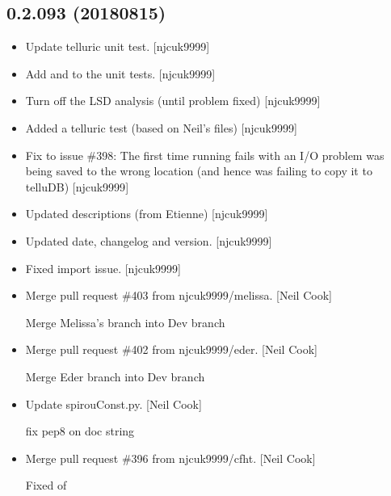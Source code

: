 \documentclass[a4paper,10pt,english]{report}
\begin{document}
\subsection{0.2.093 (2018\sphinxhyphen{}08\sphinxhyphen{}15)}
\label{\detokenize{misc/changelog:id387}}\begin{itemize}
\item {} 
Update telluric unit test. {[}njcuk9999{]}

\item {} 
Add  and  to the unit tests. {[}njcuk9999{]}

\item {} 
Turn off the LSD analysis (until problem fixed) {[}njcuk9999{]}

\item {} 
Added a telluric test (based on Neil’s files) {[}njcuk9999{]}

\item {} 
Fix to issue \#398: The first time running  fails with an
I/O problem \sphinxhyphen{}  was being saved to the wrong location (and
hence  was failing to copy it to telluDB) {[}njcuk9999{]}

\item {} 
Updated descriptions (from Etienne) {[}njcuk9999{]}

\item {} 
Updated date, changelog and version. {[}njcuk9999{]}

\item {} 
Fixed import issue. {[}njcuk9999{]}

\item {} 
Merge pull request \#403 from njcuk9999/melissa. {[}Neil Cook{]}

Merge Melissa’s branch into Dev branch

\item {} 
Merge pull request \#402 from njcuk9999/eder. {[}Neil Cook{]}

Merge Eder branch into Dev branch

\item {} 
Update spirouConst.py. {[}Neil Cook{]}

fix pep8 on doc string

\item {} 
Merge pull request \#396 from njcuk9999/cfht. {[}Neil Cook{]}

Fixed  of 

\end{itemize}
\end{document}
